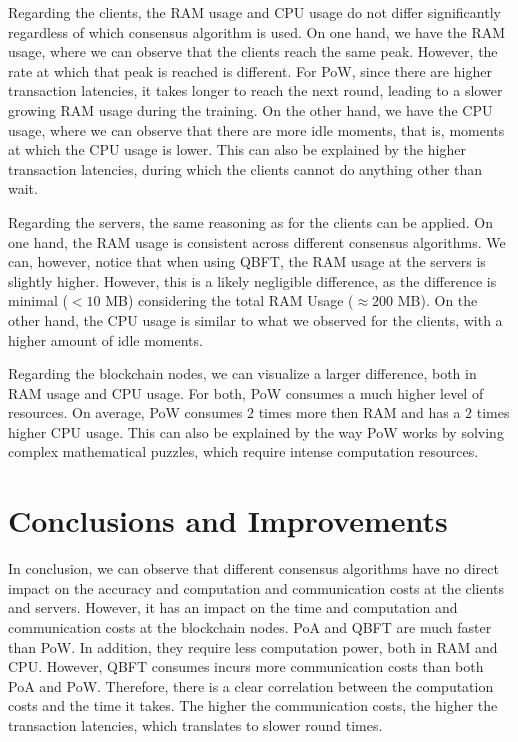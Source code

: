 Regarding the clients, the RAM usage and CPU usage do not differ significantly regardless of which consensus algorithm is used. On one hand, we have the RAM usage, where we can observe that the clients reach the same peak. However, the rate at which that peak is reached is different. For PoW, since there are higher transaction latencies, it takes longer to reach the next round, leading to a slower growing RAM usage during the training. On the other hand, we have the CPU usage, where we can observe that there are more idle moments, that is, moments at which the CPU usage is lower. This can also be explained by the higher transaction latencies, during which the clients cannot do anything other than wait.

Regarding the servers, the same reasoning as for the clients can be applied. On one hand, the RAM usage is consistent across different consensus algorithms. We can, however, notice that when using QBFT, the RAM usage at the servers is slightly higher. However, this is a likely negligible difference, as the difference is minimal ($< 10$ MB) considering the total RAM Usage ($\approx 200$ MB). On the other hand, the CPU usage is similar to what we observed for the clients, with a higher amount of idle moments.

Regarding the blockchain nodes, we can visualize a larger difference, both in RAM usage and CPU usage. For both, PoW consumes a much higher level of resources. On average, PoW consumes $2$ times more then RAM and has a $2$ times higher CPU usage. This can also be explained by the way PoW works by solving complex mathematical puzzles, which require intense computation resources.

\section{Conclusions and Improvements}

In conclusion, we can observe that different consensus algorithms have no direct impact on the accuracy and computation and communication costs at the clients and servers. However, it has an impact on the time and computation and communication costs at the blockchain nodes. PoA and QBFT are much faster than PoW. In addition, they require less computation power, both in RAM and CPU. However, QBFT consumes incurs more communication costs than both PoA and PoW. Therefore, there is a clear correlation between the computation costs and the time it takes. The higher the communication costs, the higher the transaction latencies, which translates to slower round times.

